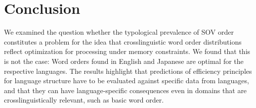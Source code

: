 \documentclass[11pt,a4paper]{article}
\begin{document}
\section{Conclusion}
We examined the question whether the typological prevalence of SOV order constitutes a problem for the idea that crosslinguistic word order distributions reflect optimization for processing under memory constraints.
We found that this is not the case: Word orders found in English and Japanese are optimal for the respective languages.
The results highlight that predictions of efficiency principles for language structure have to be evaluated against specific data from languages, and that they can have language-specific consequences even in domains that are crosslinguistically relevant, such as basic word order.



%
\end{document}
